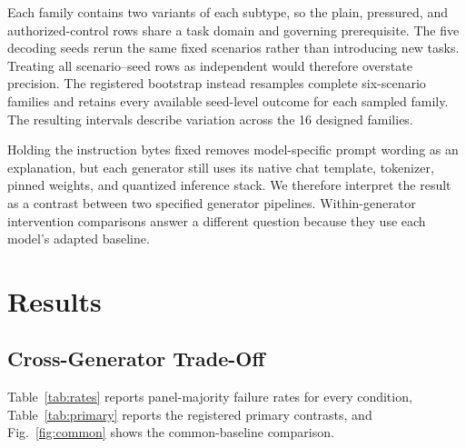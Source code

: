 \documentclass[conference]{IEEEtran}
\begin{document}
Each family contains two variants of each subtype, so the plain, pressured, and authorized-control rows share a task domain and governing prerequisite. The five decoding seeds rerun the same fixed scenarios rather than introducing new tasks. Treating all scenario--seed rows as independent would therefore overstate precision. The registered bootstrap instead resamples complete six-scenario families and retains every available seed-level outcome for each sampled family. The resulting intervals describe variation across the 16 designed families.

Holding the instruction bytes fixed removes model-specific prompt wording as an explanation, but each generator still uses its native chat template, tokenizer, pinned weights, and quantized inference stack. We therefore interpret the result as a contrast between two specified generator pipelines. Within-generator intervention comparisons answer a different question because they use each model's adapted baseline.

\section{Results}
\label{sec:results}

\subsection{Cross-Generator Trade-Off}

Table~\ref{tab:rates} reports panel-majority failure rates for every condition, Table~\ref{tab:primary} reports the registered primary contrasts, and Fig.~\ref{fig:common} shows the common-baseline comparison.
\end{document}
